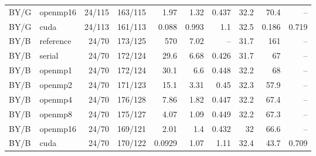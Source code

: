 \documentclass[11pt]{article}
\begin{document}
\begin{longtable}{llrrrrrrrr}
BY/G & openmp16 & 24/115 & 163/115 & 1.97 & 1.32 & 0.437 & 32.2 & 70.4 & --\\
BY/G & cuda & 24/113 & 161/113 & 0.088 & 0.993 & 1.1 & 32.5 & 0.186 & 0.719\\
BY/B & reference & 24/70 & 173/125 & 570 & 7.02 & -- & 31.7 & 161 & --\\
BY/B & serial & 24/70 & 172/124 & 29.6 & 6.68 & 0.426 & 31.7 & 67 & --\\
BY/B & openmp1 & 24/70 & 172/124 & 30.1 & 6.6 & 0.448 & 32.2 & 68 & --\\
BY/B & openmp2 & 24/70 & 171/123 & 15.1 & 3.31 & 0.45 & 32.3 & 57.9 & --\\
BY/B & openmp4 & 24/70 & 176/128 & 7.86 & 1.82 & 0.447 & 32.2 & 67.4 & --\\
BY/B & openmp8 & 24/70 & 175/127 & 4.07 & 1.09 & 0.449 & 32.2 & 67.3 & --\\
BY/B & openmp16 & 24/70 & 169/121 & 2.01 & 1.4 & 0.432 & 32 & 66.6 & --\\
BY/B & cuda & 24/70 & 170/122 & 0.0929 & 1.07 & 1.11 & 32.4 & 43.7 & 0.709\\
\bottomrule\end{longtable}\normalsize
\end{document}
